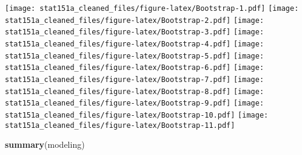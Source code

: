 \documentclass[
]{article}
\newenvironment{Shaded}{\begin{snugshade}}{\end{snugshade}}
\newcommand{\KeywordTok}[1]{\textcolor[rgb]{0.13,0.29,0.53}{\textbf{#1}}}
\newcommand{\NormalTok}[1]{#1}
\begin{document}
\texttt{[image: stat151a\_cleaned\_files/figure-latex/Bootstrap-1.pdf]}
\texttt{[image: stat151a\_cleaned\_files/figure-latex/Bootstrap-2.pdf]}
\texttt{[image: stat151a\_cleaned\_files/figure-latex/Bootstrap-3.pdf]}
\texttt{[image: stat151a\_cleaned\_files/figure-latex/Bootstrap-4.pdf]}
\texttt{[image: stat151a\_cleaned\_files/figure-latex/Bootstrap-5.pdf]}
\texttt{[image: stat151a\_cleaned\_files/figure-latex/Bootstrap-6.pdf]}
\texttt{[image: stat151a\_cleaned\_files/figure-latex/Bootstrap-7.pdf]}
\texttt{[image: stat151a\_cleaned\_files/figure-latex/Bootstrap-8.pdf]}
\texttt{[image: stat151a\_cleaned\_files/figure-latex/Bootstrap-9.pdf]}
\texttt{[image: stat151a\_cleaned\_files/figure-latex/Bootstrap-10.pdf]}
\texttt{[image: stat151a\_cleaned\_files/figure-latex/Bootstrap-11.pdf]}

\begin{Shaded}
\begin{Highlighting}[]
\KeywordTok{summary}\NormalTok{(modeling)}
\end{Highlighting}
\end{Shaded}
\end{document}
